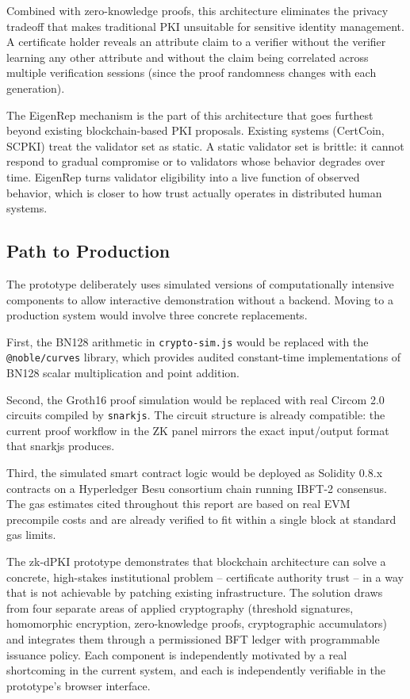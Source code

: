 \documentclass[12pt,a4paper]{article}
\begin{document}
Combined with zero-knowledge proofs, this architecture eliminates the privacy tradeoff that makes traditional PKI unsuitable for sensitive identity management. A certificate holder reveals an attribute claim to a verifier without the verifier learning any other attribute and without the claim being correlated across multiple verification sessions (since the proof randomness changes with each generation).

The EigenRep mechanism is the part of this architecture that goes furthest beyond existing blockchain-based PKI proposals. Existing systems (CertCoin, SCPKI) treat the validator set as static. A static validator set is brittle: it cannot respond to gradual compromise or to validators whose behavior degrades over time. EigenRep turns validator eligibility into a live function of observed behavior, which is closer to how trust actually operates in distributed human systems.

\subsection{Path to Production}

The prototype deliberately uses simulated versions of computationally intensive components to allow interactive demonstration without a backend. Moving to a production system would involve three concrete replacements.

First, the BN128 arithmetic in \texttt{crypto-sim.js} would be replaced with the \texttt{@noble/curves} library, which provides audited constant-time implementations of BN128 scalar multiplication and point addition.

Second, the Groth16 proof simulation would be replaced with real Circom 2.0 circuits compiled by \texttt{snarkjs}. The circuit structure is already compatible: the current proof workflow in the ZK panel mirrors the exact input/output format that snarkjs produces.

Third, the simulated smart contract logic would be deployed as Solidity 0.8.x contracts on a Hyperledger Besu consortium chain running IBFT-2 consensus. The gas estimates cited throughout this report are based on real EVM precompile costs and are already verified to fit within a single block at standard gas limits.

\vspace{0.5em}
The zk-dPKI prototype demonstrates that blockchain architecture can solve a concrete, high-stakes institutional problem -- certificate authority trust -- in a way that is not achievable by patching existing infrastructure. The solution draws from four separate areas of applied cryptography (threshold signatures, homomorphic encryption, zero-knowledge proofs, cryptographic accumulators) and integrates them through a permissioned BFT ledger with programmable issuance policy. Each component is independently motivated by a real shortcoming in the current system, and each is independently verifiable in the prototype's browser interface.
\end{document}
